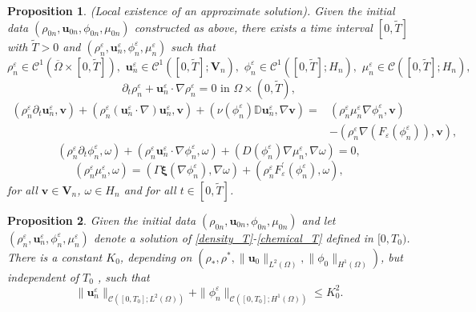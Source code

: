 \documentclass[10pt,a4paper]{amsart}
\newtheorem{proposition}{Proposition}
\def\Ga{\Gamma}
\def\bfV{\mathbf{V}}
\def\bfu{\mathbf{u}}
\def\bfv{\mathbf{v}}
\def\bfxi{\boldsymbol{\xi}}
\def\bq{\begin{equation}}
\def\eq{\end{equation}}
\begin{document}
\begin{proposition}{(Local existence of an approximate solution)}. Given the initial data $(\rho_{0n},\bfu_{0n},\phi_{0n},\mu_{0n})$ constructed as above, there exists a time interval $[0,\widetilde{T}]$ with $\widetilde{T} > 0$ and $(\rho_n^{\varepsilon},\bfu_n^{\varepsilon},\phi_n^{\varepsilon},\mu_n^{\varepsilon})$ such that
\bq
\rho_n^{\varepsilon} \in \mathcal{C}^1(\overline{\Omega}\times[0,\widetilde{T}]),\,\,\bfu_n^{\varepsilon}\in \mathcal{C}^1([0,\widetilde{T}];\bfV_n),\,\, \phi_n^{\varepsilon}\in \mathcal{C}^1([0,\widetilde{T}];H_n), \,\, \mu_n^{\varepsilon}\in \mathcal{C}([0,\widetilde{T}];H_n),
\eq
\bq
\partial_t\rho_n^{\varepsilon} + \bfu_n^{\varepsilon}\cdot\nabla\rho_n^{\varepsilon} = 0 \text{ in } \Omega\times(0,\widetilde{T}),\label{density_T}
\eq
\bq
\begin{aligned}
(\rho_n^{\varepsilon}\partial_t \bfu_n^{\varepsilon},\bfv) + (\rho_n^{\varepsilon}(\bfu_n^{\varepsilon}\cdot\nabla)\bfu_n^{\varepsilon},\bfv) + (\nu(\phi_n^{\varepsilon})\mathbb{D}\bfu_n^{\varepsilon},\nabla\bfv)=& (\rho_n^{\varepsilon}\mu_n^{\varepsilon}\nabla\phi_n^{\varepsilon},\bfv)\\
&-(\rho_n^{\varepsilon}\nabla(F_{\varepsilon}(\phi_n^{\varepsilon})),\bfv),\label{velocity_T}
\end{aligned}
\eq
\bq
(\rho_n^{\varepsilon}\partial_t\phi_n^{\varepsilon},\omega) + (\rho_n^{\varepsilon}\bfu_n^{\varepsilon}\cdot\nabla\phi_n^{\varepsilon},\omega)+ (D(\phi_n^{\varepsilon})\nabla\mu_n^{\varepsilon},\nabla\omega) = 0,\label{concentration_T}
\eq
\bq
(\rho_n^{\varepsilon}\mu_n^{\varepsilon},\omega) =(\Ga\bfxi(\nabla\phi_n^{\varepsilon}),\nabla\omega) + (\rho_n^{\varepsilon} F_{\varepsilon}^{\prime}(\phi_n^{\varepsilon}),\omega),\label{chemical_T}
\eq
for all $\bfv\in \bfV_n$, $\omega\in H_n$ and for all $t\in [0,\widetilde{T}]$.
\end{proposition}

\begin{proposition}\label{prop2}
Given the initial data $(\rho_{0n},\bfu_{0n},\phi_{0n},\mu_{0n})$ and let $(\rho_{n}^{\varepsilon},\bfu_{n}^{\varepsilon},\phi_{n}^{\varepsilon},\mu_{n}^{\varepsilon})$ denote a solution of \eqref{density_T}-\eqref{chemical_T} defined in $[0,T_0)$. There is a constant
$K_0$, depending on $(\rho_{*},\rho^{*},\|\bfu_{0}\|_{L^2(\Omega)},\|\phi_{0}\|_{H^1(\Omega)})$, but independent of $T_0$ , such that 
\bq
\|\bfu_{n}^{\varepsilon}\|_{\mathcal{C}([0,{T}_0];L^2(\Omega))} + \|\phi_{n}^{\varepsilon}\|_{\mathcal{C}([0,{T}_0];H^1(\Omega))}\leq K_0^2.
\eq
\end{proposition}
\end{document}
